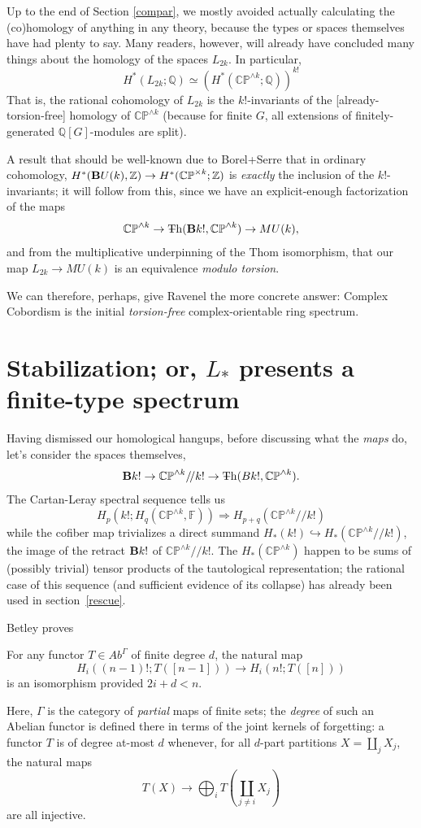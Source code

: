 \documentclass{article}
\newcommand{\CP}{\mathbb{CP}}
\newcommand{\QQ}{\mathbb{Q}}
\newcommand{\ZZ}{\mathbb{Z}}
\newcommand{\6}{\partial}
\newcommand{\8}{\infty}
\newcommand{\bq}{/\!/}
\newcommand{\smsh}{\wedge}
\begin{document}
Up to the end of Section \ref{compar}, we mostly avoided actually calculating the (co)homology of anything in any theory, because the types or spaces themselves have had plenty to say.  Many readers, however, will already have concluded many things about the homology of the spaces $L_{2k}$.  In particular, 
$$ H^*(L_{2k}; \QQ) \simeq (H^*(\CP^{\smsh k};\QQ))^{k!} $$
That is, the rational cohomology of $L_{2k}$ is the $k!$-invariants of the [already-torsion-free] homology of $\CP^{\smsh k}$ (because for finite $G$, all extensions of finitely-generated $\QQ[G]$-modules are split).

A result that should be well-known due to Borel+Serre \cite{borSer} that in ordinary cohomology, $H^*(\deloop U(k),\ZZ) \to H^*(\CP^{\times k};\ZZ)$ is {\em exactly} the inclusion of the $k!$-invariants; it will follow from this, since we have an explicit-enough factorization of the maps
$$ \CP^{\smsh k} \to \Th(\deloop k!,\CP^{\smsh k}) \to MU(k), $$
and from the multiplicative underpinning of the Thom isomorphism, that our map $L_{2k} \to MU(k)$ is an equivalence {\em modulo torsion}.

We can therefore, perhaps, give Ravenel the more concrete answer: Complex Cobordism is the initial {\em torsion-free} complex-orientable ring spectrum.

\section{Stabilization; or, $L_*$ presents a finite-type spectrum}

Having dismissed our homological hangups, before discussing what the {\em maps} do, let's consider the spaces themselves,
$$ \deloop k! \to \CP^{\smsh k}\bq k! \to \Th(Bk!,\CP^{\smsh k}).$$ 
The Cartan-Leray spectral sequence tells us
$$ H_p( k! ; H_q(\CP^{\smsh k},\mathbb{F})) \Rightarrow H_{p+q} (\CP^{\smsh k}\bq  k!) $$ 
while the cofiber map trivializes a direct summand $H_*(k!)\hookrightarrow H_*(\CP^{\smsh k}\bq k!)$, the image of the retract $\mathbf{B} k!$ of $\CP^{\smsh k}\bq k!$.
The $H_*(\CP^{\smsh k})$ happen to be sums of (possibly trivial) tensor products of the tautological representation;
 the rational case of this sequence (and sufficient evidence of its collapse) has already been used in \mbox{section \ref{rescue}}.

Betley \cite{betley} proves \begin{lemma}[Betley]\label{betstable} For any functor $T \in Ab^\Gamma$ of finite degree $d$, the natural map $$H_i( (n-1)! ; T ([n-1])) \to H_i( n! ; T([n])) $$ is an isomorphism provided $2i + d < n$.
\end{lemma} Here, $\Gamma$ is the category of {\em partial} maps of finite sets; the {\em degree} of such an Abelian functor is defined there in terms of the joint kernels of forgetting: a functor $T$ is of degree at-most $d$ whenever, for all $d$-part partitions $X = \coprod_j X_j$, the natural maps
$$ T(X) \to \bigoplus_i T(\coprod_{j\neq i} X_j) $$ 
are all injective.
\end{document}
